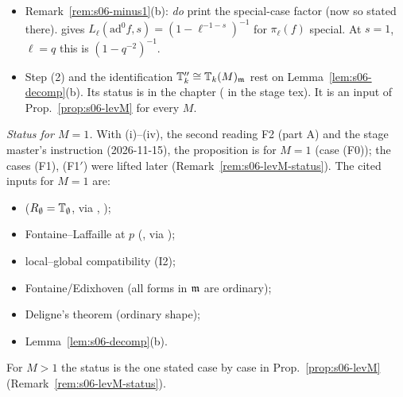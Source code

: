 \begin{remark}[$M=1$: the $T_p$ matching, minor corrections, status after the second reading]
\begin{itemize}
\item[m2] Remark~\ref{rem:s06-minus1}(b): \cite{KO} \emph{do} print the special-case factor (now so stated there). \cite[\S5.1, p.~18]{KO}
   gives
  $L_\ell(\mathrm{ad}^0f,s)=(1-\ell^{-1-s})^{-1}$ for $\pi_\ell(f)$ special. At $s=1$, $\ell=q$ this is $(1-q^{-2})^{-1}$. \stcited
\item[m3] Step (2) and the identification $\mathbb{T}''_k\cong\mathbb{T}_k(M)_{\mathfrak{m}}$ rest on Lemma~\ref{lem:s06-decomp}(b). Its status is \stpmc{} in the chapter
  (\sttoprove{} in the stage tex). It is an input of Prop.~\ref{prop:s06-levM} for every $M$.
\end{itemize}
\emph{Status for $M=1$.} With (i)--(iv), the second reading F2 (part A) and the stage master's instruction (2026-11-15), the
proposition is \stpmc{} for $M=1$ (case (F0)); the cases (F1), (F1$'$) were lifted later (Remark~\ref{rem:s06-levM-status}). The cited inputs for $M=1$ are:
\begin{itemize}
\item{} \cite[Thm~2.9, Lemma~2.4]{KO} ($R_\emptyset=\mathbb{T}_\emptyset$, via \cite{DFG}, \cite{Dim09});
\item Fontaine--Laffaille at $p$ (\cite[\S1.1.2]{DFG}, via \cite{KO});
\item local--global compatibility (I2);
\item Fontaine/Edixhoven \cite[Thm~2.6]{Edi92} (all forms in $\mathfrak{m}$ are ordinary);
\item Deligne's theorem \cite[Thm~2.5]{Edi92} (ordinary shape);
\item Lemma~\ref{lem:s06-decomp}(b).
\end{itemize}
For $M>1$ the status is the one stated case by case in Prop.~\ref{prop:s06-levM} (Remark~\ref{rem:s06-levM-status}).
\end{remark}
